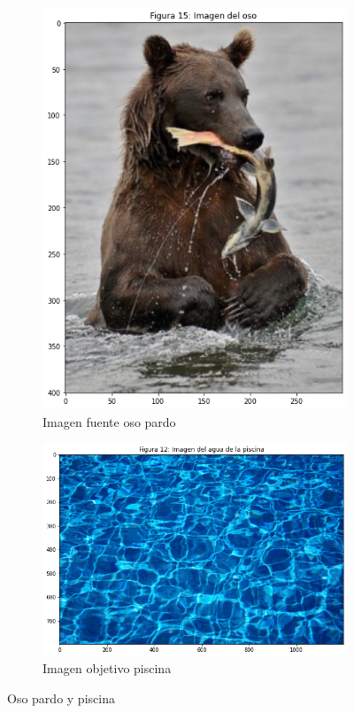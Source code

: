 \documentclass[11pt,twoside,titlepage,a4paper]{article}
\numberwithin{equation}{section} %
\theoremstyle{usual}
\begin{document}
\begin{figure}[h]
    \centering
    \begin{subfigure}[b]{.31\textwidth}
        \centering
        \includegraphics[width=\textwidth]{imagenes/PoissonImageEditing_cell_23_output_3.png}
        \caption{Imagen fuente oso pardo}
        \label{fig:cpOsoPArdo}
    \end{subfigure}%
    \begin{subfigure}[b]{.59\textwidth}
        \centering
        \includegraphics[width=\textwidth]{imagenes/PoissonImageEditing_cell_23_output_0.png}
        \caption{Imagen objetivo piscina}
        \label{fig:cpPiscina}
    \end{subfigure}
    \caption{Oso pardo y piscina }
    \label{fig:copiadoPristinoOsoOscuroYPiscina}
\end{figure}
\end{document}
